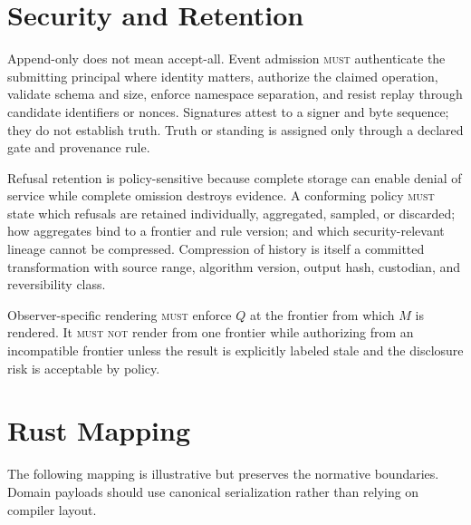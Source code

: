 \documentclass[11pt]{article}
\newcommand{\MUST}{\textsc{must}}
\newcommand{\MUSTNOT}{\textsc{must not}}
\begin{document}
\section{Security and Retention}

Append-only does not mean accept-all. Event admission \MUST{} authenticate the submitting principal where identity matters, authorize the claimed operation, validate schema and size, enforce namespace separation, and resist replay through candidate identifiers or nonces. Signatures attest to a signer and byte sequence; they do not establish truth. Truth or standing is assigned only through a declared gate and provenance rule.

Refusal retention is policy-sensitive because complete storage can enable denial of service while complete omission destroys evidence. A conforming policy \MUST{} state which refusals are retained individually, aggregated, sampled, or discarded; how aggregates bind to a frontier and rule version; and which security-relevant lineage cannot be compressed. Compression of history is itself a committed transformation with source range, algorithm version, output hash, custodian, and reversibility class.

Observer-specific rendering \MUST{} enforce $Q$ at the frontier from which $M$ is rendered. It \MUSTNOT{} render from one frontier while authorizing from an incompatible frontier unless the result is explicitly labeled stale and the disclosure risk is acceptable by policy.

\section{Rust Mapping}

The following mapping is illustrative but preserves the normative boundaries. Domain payloads should use canonical serialization rather than relying on compiler layout.
\end{document}
